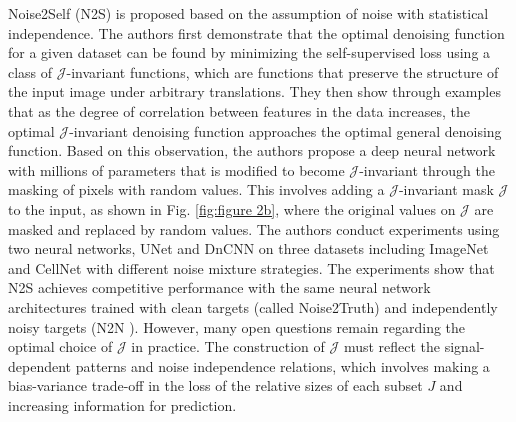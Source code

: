 \documentclass[conference]{IEEEtran}
\begin{document}
Noise2Self (N2S) \cite{batson2019noise2self} is proposed based on the assumption of noise with statistical independence.
The authors first demonstrate that the optimal denoising function for a given dataset can be found by minimizing the self-supervised loss using a class of $\mathcal{J}$-invariant functions, which are functions that preserve the structure of the input image under arbitrary translations. They then show through examples that as the degree of correlation between features in the data increases, the optimal $\mathcal{J}$-invariant denoising function approaches the optimal general denoising function.
Based on this observation, the authors propose a deep neural network with millions of parameters that is modified to become $\mathcal{J}$-invariant through the masking of pixels with random values. This involves adding a $\mathcal{J}$-invariant mask $\mathcal{J}$ to the input, as shown in Fig. \ref{fig:figure 2b}, where the original values on $\mathcal{J}$ are masked and replaced by random values. The authors conduct experiments using two neural networks, UNet \cite{ko2018pac} and DnCNN \cite{zhang2017beyond} on three datasets including ImageNet \cite{deng2009imagenet} and CellNet \cite{cahan2014cellnet} with different noise mixture strategies. 
The experiments show that N2S achieves competitive performance with the same neural network architectures trained with clean targets (called Noise2Truth) and independently noisy targets (N2N \cite{lehtinen2018noise2noise}). However, many open questions remain regarding the optimal choice of $\mathcal{J}$ in practice. The construction of $\mathcal{J}$ must reflect the signal-dependent patterns and noise independence relations, which involves making a bias-variance trade-off in the loss of the relative sizes of each subset $J$ and increasing information for prediction.
\end{document}
